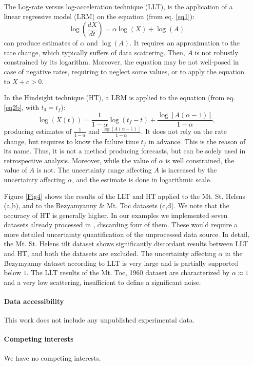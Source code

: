 \documentclass{article}
\begin{document}
The Log-rate versus log-acceleration technique (LLT), is the application of a linear regressive model (LRM) on the equation (from eq. \ref{eq1}):
$$\log\left(\frac{dX}{dt}\right)=\alpha\log(X)+\log(A)$$
can produce estimates of $\alpha$ and $\log(A)$. It requires an approximation to the rate change, which typically suffers of data scattering. Then, $A$ is not robustly constrained by its logarithm. Moreover, the equation may be not well-posed in case of negative rates, requiring to neglect some values, or to apply the equation to $X+c > 0$.

In the Hindsight technique (HT), a LRM is applied to the equation (from eq. \ref{eq2b}, with $t_0=t_f$):
$$\log(X(t))=\frac{1}{1-\alpha}\log(t_f-t)+\frac{\log[A(\alpha-1)]}{1-\alpha},$$
producing estimates of $\frac{1}{1-\alpha}$ and $\frac{\log[A(\alpha-1)]}{1-\alpha}$. It does not rely on the rate change, but requires to know the failure time $t_f$ in advance. This is the reason of its name. Thus, it is not a method producing forecasts, but can be solely used in retrospective analysis. Moreover, while the value of $\alpha$ is well constrained, the value of $A$ is not. The uncertainty range affecting $A$ is increased by the uncertainty affecting $\alpha$, and the estimate is done in logarithmic scale.

Figure \ref{Fig4} shows the results of the LLT and HT applied to the Mt. St. Helens (a,b), and to the Bezyamyanny \& Mt. Toc datasets (c,d). We note that the accuracy of HT is generally higher. In our examples we implemented seven datasets already processed in \cite{Voight1988}, discarding four of them. These would require a more detailed uncertainty quantification of the unprocessed data source. In detail, the Mt. St. Helens tilt dataset shows significantly discordant results between LLT and HT, and both the datasets are excluded. The uncertainty affecting $\alpha$ in the Bezymyanny dataset according to LLT is very large and is partially supported below $1$. The LLT results of the Mt. Toc, 1960 dataset are characterized by $\alpha\approx 1$ and a very low scattering, insufficient to define a significant noise.

\paragraph{Data accessibility}
This work does not include any unpublished experimental data.

\paragraph{Competing interests}
We have no competing interests.
\end{document}
